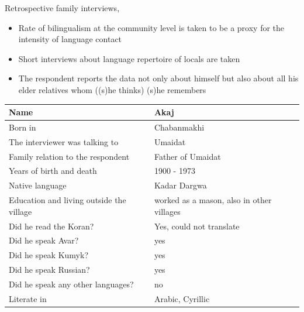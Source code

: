 \documentclass[13pt, t]{beamer}
\begin{document}
\begin{frame}{Retrospective family interviews, \citep{dobrushina2013}}
\begin{itemize}
\item Rate of bilingualism at the community level is taken to be a proxy for the intensity of language contact 
\item Short interviews about language repertoire of locals are taken
\item The respondent reports the data not only about himself but also about all his elder relatives whom ((s)he thinks) (s)he remembers
\end{itemize}
\small
\vspace{1mm}
\begin{tabular}{|l|l|}
\hline
Name                                     & Akaj                                      \\ \hline
Born in                                  & Chabanmakhi                               \\ \hline
The interviewer was talking to           & Umaidat                                   \\ \hline
Family relation to the respondent        & Father of Umaidat                         \\ \hline
Years of birth and death                 & 1900 - 1973                               \\ \hline
Native language                          & Kadar Dargwa                              \\ \hline
Education and living outside the village & worked as a mason, also in other villages \\ \hline
Did he read the Koran?                   & Yes, could not translate                  \\ \hline
Did he speak Avar?                       & yes                                       \\ \hline
Did he speak Kumyk?                      & yes                                       \\ \hline
Did he speak Russian?                    & yes                                       \\ \hline
Did he speak any other languages?        & no                                        \\ \hline
Literate in                              & Arabic, Cyrillic                         \\ \hline
\end{tabular}
\end{frame}
\end{document}
